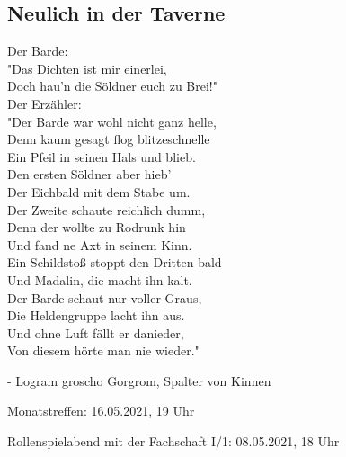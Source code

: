 \documentclass[final]{multiversum}
\begin{document}
\subsection{Neulich in der Taverne}
Der Barde:\\
"Das Dichten ist mir einerlei,\\
Doch hau'n die Söldner euch zu Brei!"\\[1em]
Der Erzähler:\\ 
"Der Barde war wohl nicht ganz helle,\\
Denn kaum gesagt flog blitzeschnelle\\
Ein Pfeil in seinen Hals und blieb.\\
Den ersten Söldner aber hieb'\\
Der Eichbald mit dem Stabe um. \\
Der Zweite schaute reichlich dumm,\\
Denn der wollte zu Rodrunk hin \\
Und fand ne Axt in seinem Kinn.\\
Ein Schildstoß stoppt den Dritten bald\\
Und Madalin, die macht ihn kalt.\\
Der Barde schaut nur voller Graus, \\
Die Heldengruppe lacht ihn aus.\\
Und ohne Luft fällt er danieder,\\
Von diesem hörte man nie wieder."
\begin{flushright}- Logram groscho Gorgrom, Spalter von Kinnen\end{flushright}



\begin{termine}
\item Monatstreffen: 16.05.2021, 19 Uhr
\item Rollenspielabend mit der Fachschaft I/1: 08.05.2021, 18 Uhr
\end{termine}
\impressum
\end{document}
